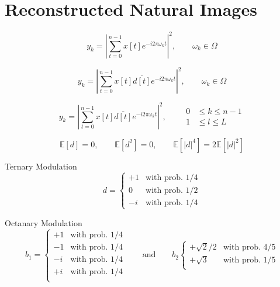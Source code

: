\chapter{Reconstructed Natural Images}






\begin{equation*}
  y_k = \left| \sum_{t=0}^{n-1} x[t] e^{-i2\pi\omega_kt} \right|^2 , \qquad \omega_k \in \Omega
\end{equation*}

\begin{equation*}
  y_k = \left| \sum_{t=0}^{n-1} x[t]\overline{d[t]} e^{-i2\pi\omega_kt} \right|^2 , \qquad \omega_k \in \Omega
\end{equation*}

\begin{equation*}
  y_k = \left| \sum_{t=0}^{n-1} x[t]\overline{d[t]} e^{-i2\pi\omega_kt} \right|^2 , \qquad \begin{split}
  0 &\leq k \leq n-1\\
  1 &\leq l \leq L
  \end{split}
\end{equation*}

\begin{equation*}
  \mathbb{E}\left[d\right] = 0, \qquad \mathbb{E}\left[d^2\right] = 0, \qquad\mathbb{E}\left[\left|d\right|^4\right] = 2\mathbb{E}\left[\left|d\right|^2\right]
\end{equation*}

Ternary Modulation
\begin{equation*}
  d =
      \begin{cases}
          +1 & \text{with prob.  $1/4$}\\
          0 & \text{with prob.  $1/2$}\\
          -i & \text{with prob.  $1/4$}
      \end{cases}  
\end{equation*}





Octanary Modulation
\begin{equation*}
  b_1 =
      \begin{cases}
          +1 & \text{with prob.  $1/4$}\\
          -1 & \text{with prob.  $1/4$}\\
          -i & \text{with prob.  $1/4$}\\
          +i & \text{with prob.  $1/4$}\\

      \end{cases}  
      \qquad \text{and} \qquad 
  b_2 
      \begin{cases}  
        +\sqrt{2}/2 & \text{with prob.  $4/5$}\\
        +\sqrt{3} & \text{with prob.  $1/5$}\\
    \end{cases}   
\end{equation*}








